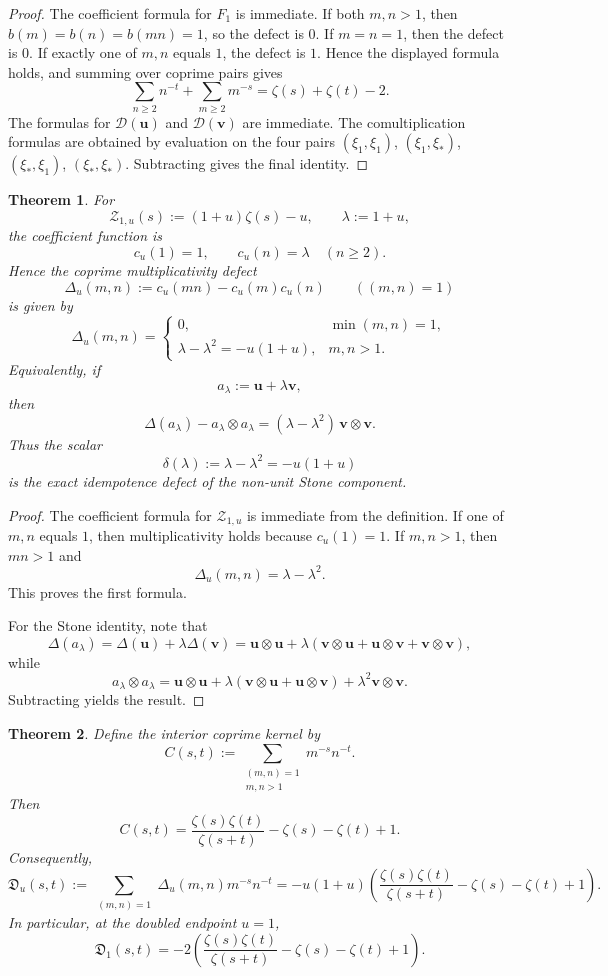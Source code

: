 \documentclass[11pt]{amsart}
\numberwithin{equation}{section}
\newtheorem{theorem}{Theorem}[section]
\theoremstyle{definition}
\begin{document}
\begin{proof}
The coefficient formula for $F_1$ is immediate. If both $m,n>1$, then $b(m)=b(n)=b(mn)=1$, so the defect is $0$. If $m=n=1$, then the defect is $0$. If exactly one of $m,n$ equals $1$, the defect is $1$. Hence the displayed formula holds, and summing over coprime pairs gives
\[
\sum_{n\ge2}n^{-t}+\sum_{m\ge2}m^{-s}=\zeta(s)+\zeta(t)-2.
\]
The formulas for $\mathcal D(\mathbf u)$ and $\mathcal D(\mathbf v)$ are immediate. The comultiplication formulas are obtained by evaluation on the four pairs $(\xi_1,\xi_1)$, $(\xi_1,\xi_\ast)$, $(\xi_\ast,\xi_1)$, $(\xi_\ast,\xi_\ast)$. Subtracting gives the final identity. 
\end{proof}

\begin{theorem}\label{thm:two-sheet-defect}
For
\[
\mathcal Z_{1,u}(s):=(1+u)\zeta(s)-u,
\qquad
\lambda:=1+u,
\]
the coefficient function is
\[
c_u(1)=1,
\qquad
c_u(n)=\lambda
\quad(n\ge2).
\]
Hence the coprime multiplicativity defect
\[
\Delta_u(m,n):=c_u(mn)-c_u(m)c_u(n)
\qquad((m,n)=1)
\]
is given by
\[
\Delta_u(m,n)=
\begin{cases}
0,&\min(m,n)=1,\\[1mm]
\lambda-\lambda^2=-u(1+u),&m,n>1.
\end{cases}
\]
Equivalently, if
\[
a_\lambda:=\mathbf u+\lambda\mathbf v,
\]
then
\[
\Delta(a_\lambda)-a_\lambda\otimes a_\lambda
=
(\lambda-\lambda^2)\,\mathbf v\otimes\mathbf v.
\]
Thus the scalar
\[
\delta(\lambda):=\lambda-\lambda^2=-u(1+u)
\]
is the exact idempotence defect of the non-unit Stone component.
\end{theorem}

\begin{proof}
The coefficient formula for $\mathcal Z_{1,u}$ is immediate from the definition. If one of $m,n$ equals $1$, then multiplicativity holds because $c_u(1)=1$. If $m,n>1$, then $mn>1$ and
\[
\Delta_u(m,n)=\lambda-\lambda^2.
\]
This proves the first formula.

For the Stone identity, note that
\[
\Delta(a_\lambda)=\Delta(\mathbf u)+\lambda\Delta(\mathbf v)
=\mathbf u\otimes\mathbf u+
\lambda(\mathbf v\otimes\mathbf u+\mathbf u\otimes\mathbf v+\mathbf v\otimes\mathbf v),
\]
while
\[
a_\lambda\otimes a_\lambda
=\mathbf u\otimes\mathbf u+
\lambda(\mathbf v\otimes\mathbf u+\mathbf u\otimes\mathbf v)+
\lambda^2\mathbf v\otimes\mathbf v.
\]
Subtracting yields the result. 
\end{proof}

\begin{theorem}\label{thm:coprime-kernel}
Define the interior coprime kernel by
\[
C(s,t):=\sum_{\substack{(m,n)=1\\ m,n>1}}m^{-s}n^{-t}.
\]
Then
\[
C(s,t)=\frac{\zeta(s)\zeta(t)}{\zeta(s+t)}-\zeta(s)-\zeta(t)+1.
\]
Consequently,
\[
\mathfrak D_u(s,t):=
\sum_{\substack{(m,n)=1}}\Delta_u(m,n)m^{-s}n^{-t}
=
-u(1+u)
\left(
\frac{\zeta(s)\zeta(t)}{\zeta(s+t)}-\zeta(s)-\zeta(t)+1
\right).
\]
In particular, at the doubled endpoint $u=1$,
\[
\mathfrak D_1(s,t)=
-2
\left(
\frac{\zeta(s)\zeta(t)}{\zeta(s+t)}-\zeta(s)-\zeta(t)+1
\right).
\]
\end{theorem}
\end{document}
